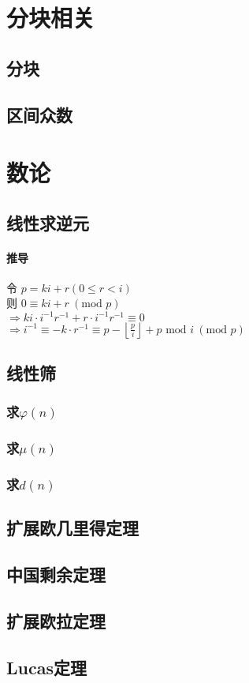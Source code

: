 \documentclass{article}
\begin{document}
	\newpage

	\section{分块相关}
		\subsection{分块}
		\subsection{区间众数}

	\newpage
	
	\section{数论}
		\subsection{线性求逆元}
			\paragraph{推导}
			令 $p = ki + r (0 \le r < i)$ \\
			则 $0 \equiv ki + r \: (\text{mod } p)$ \\
			$\Rightarrow ki \cdot i^{-1} r^{-1} + r \cdot i^{-1} r^{-1} \equiv 0$ \\
			$\Rightarrow i^{-1} \equiv -k \cdot r^{-1} \equiv p - \left\lfloor \frac{p}{i}\right\rfloor + p \text{ mod } i \: ( \text{mod } p )$
			
			
		\subsection{线性筛}
			\subsubsection{求$\varphi(n)$}
			\subsubsection{求$\mu(n)$}
			\subsubsection{求$d(n)$}
		\subsection{扩展欧几里得定理}
		\subsection{中国剩余定理}
		\subsection{扩展欧拉定理}
		\subsection{Lucas定理}
\end{document}
